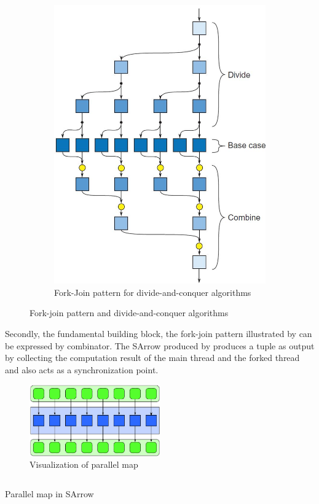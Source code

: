 \begin{figure}[ht]
\begin{subfigure}[b]{0.475\textwidth}
        \includegraphics[width=\textwidth]{arrow/dq.png}
        \caption{Fork-Join pattern for divide-and-conquer algorithms \cite{mccoolStructuredParallelPrograming2012}}
        \label{SArrow:fig:dq}
    \end{subfigure}
    \caption{Fork-join pattern and divide-and-conquer algorithms}
\end{figure}

Secondly, the fundamental building block, the fork-join pattern illustrated by  can be expressed by \hask{&&&} combinator. The SArrow produced by \hask{&&&} produces a tuple as output by collecting the computation result of the main thread and the forked thread and also acts as a synchronization point.

\begin{figure}[ht]
    \centering
    \includegraphics[width=0.5\textwidth]{arrow/pmap.png} 
    \caption{Visualization of parallel map \cite{mccoolStructuredParallelPrograming2012}}
    \label{arrow:fig:pmap}
\end{figure}
\begin{listing}[ht]
    \inputminted{Haskell}{arrow/pmap.hs}
    \caption{Parallel map in SArrow}
    \label{arrow:code:pmap}
\end{listing}

